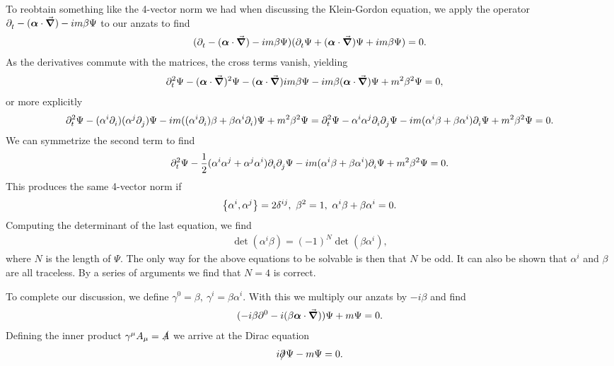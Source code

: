 To reobtain something like the 4-vector norm we had when discussing the Klein-Gordon equation, we apply the operator $\partial^{}_{t} - (\vb*{\alpha}\cdot\grad{}) - im\beta\Psi$ to our anzats to find
\begin{align*}
	(\partial^{}_{t} - (\vb*{\alpha}\cdot\grad{}) - im\beta\Psi)(\partial^{}_{t}{\Psi} + (\vb*{\alpha}\cdot\grad{})\Psi + im\beta\Psi) = 0.
\end{align*}
As the derivatives commute with the matrices, the cross terms vanish, yielding
\begin{align*}
	\partial^{2}_{t}{\Psi} - (\vb*{\alpha}\cdot\grad{})^{2}\Psi - (\vb*{\alpha}\cdot\grad{})im\beta\Psi - im\beta(\vb*{\alpha}\cdot\grad{})\Psi + m^{2}\beta^{2}\Psi &= 0,
\end{align*}
or more explicitly
\begin{align*}
	\partial^{2}_{t}{\Psi} - (\alpha^{i}\partial^{}_{i}{})(\alpha^{j}\partial^{}_{j}{})\Psi - im((\alpha^{i}\partial^{}_{i}{})\beta + \beta\alpha^{i}\partial^{}_{i}{})\Psi + m^{2}\beta^{2}\Psi = \partial^{2}_{t}{\Psi} - \alpha^{i}\alpha^{j}\partial^{}_{i}{\partial^{}_{j}{\Psi}} - im(\alpha^{i}\beta + \beta\alpha^{i})\partial^{}_{i}{\Psi} + m^{2}\beta^{2}\Psi = 0.
\end{align*}
We can symmetrize the second term to find
\begin{align*}
	\partial^{2}_{t}{\Psi} - \frac{1}{2}(\alpha^{i}\alpha^{j} + \alpha^{j}\alpha^{i})\partial^{}_{i}{\partial^{}_{j}{\Psi}} - im(\alpha^{i}\beta + \beta\alpha^{i})\partial^{}_{i}{\Psi} + m^{2}\beta^{2}\Psi = 0.
\end{align*}
This produces the same 4-vector norm if
\begin{align*}
	\acomm{\alpha^{i}}{\alpha^{j}} = 2\delta^{ij},\ \beta^{2} = 1,\ \alpha^{i}\beta + \beta\alpha^{i} = 0.
\end{align*}
Computing the determinant of the last equation, we find
\begin{align*}
	\det(\alpha^{i}\beta) = (-1)^{N}\det(\beta\alpha^{i}),
\end{align*}
where $N$ is the length of $\Psi$. The only way for the above equations to be solvable is then that $N$ be odd. It can also be shown that $\alpha^{i}$ and $\beta$ are all traceless. By a series of arguments we find that $N = 4$ is correct.

To complete our discussion, we define $\gamma^{0} = \beta,\ \gamma^{i} = \beta\alpha^{i}$. With this we multiply our anzats by $-i\beta$ and find
\begin{align*}
	(-i\beta\partial^{0}_{} - i(\beta\vb*{\alpha}\cdot\grad{}))\Psi + m\Psi = 0.
\end{align*}
Defining the inner product $\gamma^{\mu}A_{\mu} = \slashed{A}$ we arrive at the Dirac equation
\begin{align*}
	i\slashed{\partial^{}_{}{}}\Psi - m\Psi = 0.
\end{align*}

